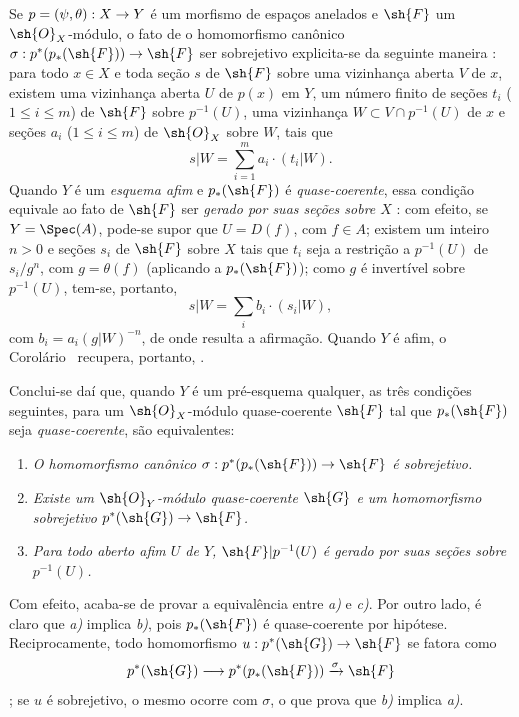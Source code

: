 \documentclass[oneside,10pt]{amsart}
\makeatletter
\renewcommand{\leq}{\leqslant}
\newcommand{\ega@arrow}[2]{\mathchoice{#1}{#2}{#2}{#2}}
\renewcommand{\to}{\ega@arrow{\longrightarrow}{\rightarrow}}
\newcommand{\oldpage}[2][]{\marginnote{\normalfont\footnotesize\textbf{#1}~|~#2}\ignorespaces}
\let\EGAOriginalLabel\label
\renewcommand{\label}[1]{\phantomsection\EGAOriginalLabel{#1}}
\makeatother
\begin{document}
\begin{remarks}[3.4.7]
\label{II.3.4.7}
Se $p=(\psi,\theta):X\to Y$ é um morfismo de espaços anelados e $\sh{F}$ um $\sh{O}_X$-módulo, o fato de o homomorfismo canônico $\sigma:p^*(p_*(\sh{F}))\to\sh{F}$ ser sobrejetivo explicita-se da seguinte maneira : para todo $x\in X$ e toda seção $s$ de $\sh{F}$ sobre uma vizinhança aberta $V$ de $x$, existem uma vizinhança aberta $U$ de $p(x)$ em $Y$, um número finito de seções $t_i$ ($1\leq i\leq m$) de $\sh{F}$ sobre $p^{-1}(U)$, uma vizinhança $W\subset V\cap p^{-1}(U)$ de $x$ e seções $a_i$ ($1\leq i\leq m$) de $\sh{O}_X$ sobre $W$, tais que
\[
  s|W=\sum_{i=1}^m a_i\cdot(t_i|W).
\]
Quando $Y$ é um \emph{esquema afim} e $p_*(\sh{F})$ é \emph{quase-coerente}, essa condição equivale ao fato de $\sh{F}$ ser \emph{gerado por suas seções sobre $X$} : com efeito, se $Y=\Spec(A)$, pode-se supor que $U=D(f)$, com $f\in A$;
existem um inteiro $n>0$ e seções $s_i$ de $\sh{F}$ sobre $X$ tais que $t_i$ seja a restrição a $p^{-1}(U)$ de $s_i/g^n$, com $g=\theta(f)$ (aplicando  a $p_*(\sh{F})$);
como $g$ é invertível sobre $p^{-1}(U)$, tem-se, portanto,
\[
  s|W=\sum_i b_i\cdot(s_i|W),
\]
com $b_i=a_i(g|W)^{-n}$, de onde resulta a afirmação.
Quando $Y$ é afim, o Corolário~ recupera, portanto, .

Conclui-se daí que, quando $Y$ é um pré-esquema qualquer, as três condições
\oldpage[II]{61}
seguintes, para um $\sh{O}_X$-módulo quase-coerente $\sh{F}$ tal que $p_*(\sh{F})$ seja \emph{quase-coerente}, são equivalentes:
\begin{enumerate}
  \item[a)] \emph{O homomorfismo canônico $\sigma:p^*(p_*(\sh{F}))\to\sh{F}$ é sobrejetivo.}
  \item[b)] \emph{Existe um $\sh{O}_Y$-módulo quase-coerente $\sh{G}$ e um homomorfismo sobrejetivo $p^*(\sh{G})\to\sh{F}$.}
  \item[c)] \emph{Para todo aberto afim $U$ de $Y$, $\sh{F}|p^{-1}(U)$ é gerado por suas seções sobre $p^{-1}(U)$.}
\end{enumerate}

Com efeito, acaba-se de provar a equivalência entre \emph{a)} e \emph{c)}.
Por outro lado, é claro que \emph{a)} implica \emph{b)}, pois $p_*(\sh{F})$ é quase-coerente por hipótese.
Reciprocamente, todo homomorfismo $u:p^*(\sh{G})\to\sh{F}$ se fatora como
\[
  p^*(\sh{G})\to p^*(p_*(\sh{F}))\xrightarrow{\sigma}\sh{F}
\]
;
se $u$ é sobrejetivo, o mesmo ocorre com $\sigma$, o que prova que \emph{b)} implica \emph{a)}.
\end{remarks}
\end{document}
